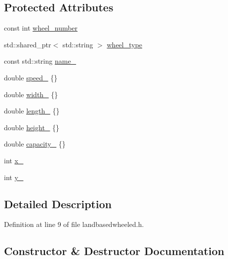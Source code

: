 \subsection*{Protected Attributes}
\begin{DoxyCompactItemize}
\item 
const int \hyperlink{classrwa3_1_1_land_based_wheeled_a99064bf2a79b4c18eb43810434ed934d}{wheel\+\_\+number}
\item 
std\+::shared\+\_\+ptr$<$ std\+::string $>$ \hyperlink{classrwa3_1_1_land_based_wheeled_a1593d4e30cea415b600b849c1af7f092}{wheel\+\_\+type}
\item 
const std\+::string \hyperlink{classrwa3_1_1_land_based_wheeled_a4acc5c38da9c0c69b878024af68c5f0e}{name\+\_\+}
\item 
double \hyperlink{classrwa3_1_1_land_based_wheeled_a647c5fd6a33ec1b3b3a72c205fa43a3b}{speed\+\_\+} \{\}
\item 
double \hyperlink{classrwa3_1_1_land_based_wheeled_aef4cab9229c3c625c5698497873fec9f}{width\+\_\+} \{\}
\item 
double \hyperlink{classrwa3_1_1_land_based_wheeled_aa307fdcfc1c1b6528732a742b3ca8de9}{length\+\_\+} \{\}
\item 
double \hyperlink{classrwa3_1_1_land_based_wheeled_ac4ae319794a7dd4500160725ebb2b3a0}{height\+\_\+} \{\}
\item 
double \hyperlink{classrwa3_1_1_land_based_wheeled_ae4c27098e9bfc2ebc1d8c0e418949f7e}{capacity\+\_\+} \{\}
\item 
int \hyperlink{classrwa3_1_1_land_based_wheeled_a89b4d09a70e5112f1bb7fbee55b660a6}{x\+\_\+}
\item 
int \hyperlink{classrwa3_1_1_land_based_wheeled_a553ac2a1ede03b35820f0200a7606f8e}{y\+\_\+}
\end{DoxyCompactItemize}


\subsection{Detailed Description}


Definition at line 9 of file landbasedwheeled.\+h.



\subsection{Constructor \& Destructor Documentation}
\mbox{\label{classrwa3_1_1_land_based_wheeled_a0a8f57819c36e24c6b2320d8088919af}} 
